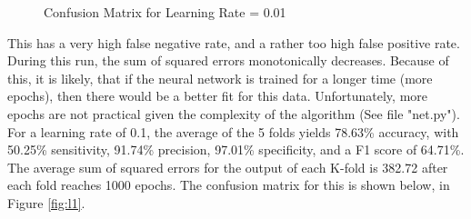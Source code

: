 \documentclass[tikz]{article}
\begin{document}
\begin{figure}[H]
\begin{center}
\caption{Confusion Matrix for Learning Rate = 0.01}
\label{fig:l01}
\end{center}
\end{figure}

This has a very high false negative rate, and a rather too high false positive rate. During this run, the sum of squared errors monotonically decreases. Because of this, it is likely, that if the neural network is trained for a longer time (more epochs), then there would be a better fit for this data. Unfortunately, more epochs are not practical given the complexity of the algorithm (See file "net.py"). \\

For a learning rate of 0.1, the average of the 5 folds yields 78.63\% accuracy, with 50.25\% sensitivity, 91.74\% precision, 97.01\% specificity, and a F1 score of 64.71\%. The average sum of squared errors for the output of each K-fold is 382.72 after each fold reaches 1000 epochs. The confusion matrix for this is shown below, in Figure \ref{fig:l1}.
\end{document}
